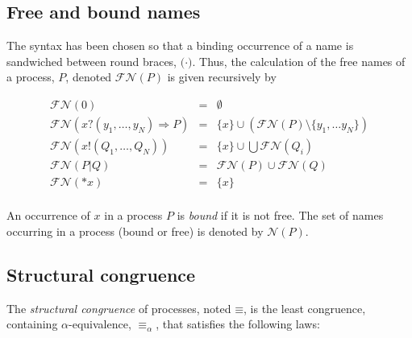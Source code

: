 \documentclass[]{amsart}
\newcommand{\id}[1]{\texttt{#1}}
\newcommand{\pzero}{\mathbin{0}}
\newcommand{\juxtap}{\mathbin{\id{|}}}
\newcommand{\scong}{\mathbin{\equiv}}
\newcommand{\alphaeq}{\mathbin{\equiv_{\alpha}}}
\newcommand{\names}[1]{\mathbin{\mathcal{N}(#1)}}
\newcommand{\freenames}[1]{\mathbin{\mathcal{FN}(#1)}}
\newcommand{\binpar}[2]{#1 \juxtap #2}
\newcommand{\bc}{\mathbin{\mathbf{::=}}}
\theoremstyle{definition}
\theoremstyle{remark}
\numberwithin{equation}{subsection}
\begin{document}

\subsection{Free and bound names}

The syntax has been chosen so that a binding occurrence of a name is
sandwiched between round braces, ${(} \cdot {)}$. Thus, the
calculation of the free names of a process, $P$, denoted
$\freenames{P}$ is given recursively by

	\begin{eqnarray*}
		\freenames{\pzero} & = & \emptyset \\
		\freenames{{x}{?}{( y_1, \ldots, y_N )} \Rightarrow {P}} & = & \{ x \} \cup (\freenames{P} \setminus \{ y_1, \ldots y_N \}) \\
		\freenames{{x}{!}{( Q_1, \ldots, Q_N )}} & = & \{ x \} \cup \bigcup \freenames{Q_i} \\
		\freenames{\binpar{P}{Q}} & = & \freenames{P} \cup \freenames{Q} \\
		\freenames{{*}{x}} & = & \{ x \} \\
	\end{eqnarray*}

An occurrence of $x$ in a process $P$ is \textit{bound} if it is not
free. The set of names occurring in a process (bound or free) is
denoted by $\names{P}$.

\subsection{Structural congruence}

The {\em structural congruence} of processes, noted $\scong$, is the
least congruence, containing $\alpha$-equivalence, $\alphaeq$, that
satisfies the following laws:
\end{document}
